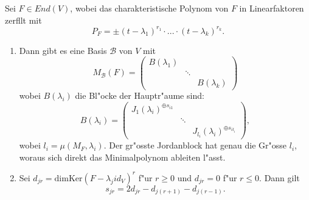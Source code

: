 \documentclass[9pt, a4paper, twocolumn, landscape]{article}
\newcommand{\comment}[1]{}
\begin{document}
\begin{theorem}
Sei $F \in End(V)$, wobei das charakteristische Polynom von $F$ in Linearfaktoren zerf\aee llt mit
$$P_F = \pm (t - \lambda_1)^{r_1} \cdot ... \cdot (t - \lambda_k)^{r_k}.$$
\begin{enumerate}
\item Dann gibt es eine Basis $\mathcal{B}$ von $V$ mit 
$$
M_\mathcal{B}(F) = \left( \begin{array}{ccc}
B(\lambda_1) & & \\ & \ddots & \\ & & B(\lambda_k)
\end{array} \right)
$$
wobei $B(\lambda_i)$ die Bl"ocke der Hauptr"aume sind:
$$
B(\lambda_i) = \left(
\begin{array}{ccc} J_1(\lambda_i)^{\oplus s_{i1}} & & \\ & \ddots & \\ & & J_{l_i}(\lambda_i)^{\oplus s_{il_i}}
\end{array}
\right),
$$
wobei $l_i = \mu (M_F, \lambda_i)$. Der gr"osste Jordanblock hat genau die Gr"osse $l_i$, woraus sich direkt das Minimalpolynom ableiten l"asst.
\item Sei $d_{jr} = \mathrm{dim}\mathrm{Ker}(F - \lambda_j id_V)^r$ f"ur $r \geq 0$ und $d_{jr} = 0$ f"ur $r \leq 0$. Dann gilt
$$
s_{jr} = 2d_{jr} - d_{j(r + 1)} - d_{j(r-1)}.
$$
\comment{
$M_\mathcal{B}(F) = 
\left(\begin{array}{ccc}
\lambda_{1} E_{r_{1}}+N_{1} & & 0 
\\ & \ddots &  
\\ 0 & & \lambda_{k} E_{r_{k}}+N_{k}
\end{array}\right).$
\\ $\lambda_i E_{r_i} + N_i = \left(\begin{array}{ccc}
B_{1, d_1} & & 0 
\\ & \ddots &  
\\ 0 & & B_{1, d_2}
\end{array}\right)$
 besteht dabei aus Jordanbl\oee cken, welche diese Form haben:
\\ \centerline{$B_{i, d} = \left(\begin{array}{cccc}\lambda_{i} & 1 & & 
\\ & \ddots & \ddots & 
\\ & & \ddots & 1 
\\ & & & \lambda_{i}\end{array}\right). \in M( r_i \times r_i, K)$}


}
\end{enumerate}
\end{theorem}
\end{document}
